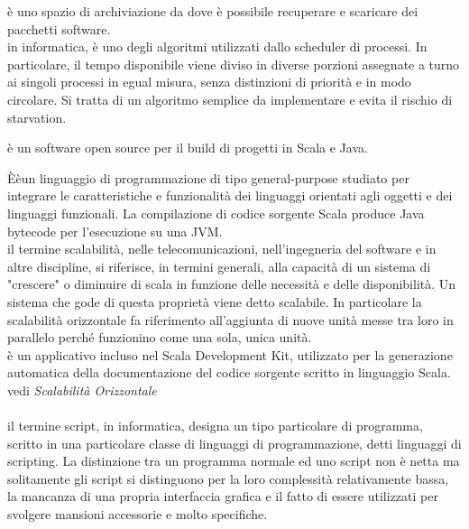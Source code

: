 \documentclass{scalatekids-article}
\begin{document}
   è uno spazio di archiviazione da dove è possibile recuperare e scaricare dei pacchetti software.
  \\
  
   in informatica, è uno degli algoritmi utilizzati dallo scheduler di processi.
  In particolare, il tempo disponibile viene diviso in diverse porzioni assegnate a turno ai singoli processi in egual misura, senza distinzioni di priorità e in modo circolare.
  Si tratta di un algoritmo semplice da implementare e evita il rischio di starvation.
  \\


   è un software open source per il build di progetti in Scala e Java.

   Èèun linguaggio di programmazione di tipo general-purpose studiato per integrare le caratteristiche e funzionalità dei linguaggi orientati agli oggetti e dei linguaggi funzionali. La compilazione di codice sorgente Scala produce Java bytecode per l'esecuzione su una JVM.
  \\

   il termine scalabilità, nelle telecomunicazioni, nell'ingegneria del software e in altre discipline, si riferisce, in termini generali, alla capacità di un sistema di "crescere" o diminuire di scala in funzione delle necessità e delle disponibilità. Un sistema che gode di questa proprietà viene detto scalabile.
  In particolare la scalabilità orizzontale fa riferimento all’aggiunta di nuove unità messe tra loro in parallelo perché funzionino come una sola, unica unità.
  \\

   è un applicativo incluso nel Scala Development Kit, utilizzato per la generazione automatica della documentazione del codice sorgente scritto in linguaggio Scala.
  \\

   vedi \textit{Scalabilità Orizzontale}
  \\
  
  \\

   il termine script, in informatica, designa un tipo particolare di programma, scritto in una particolare classe di linguaggi di programmazione, detti linguaggi di scripting.
  La distinzione tra un programma normale ed uno script non è netta ma solitamente gli script si distinguono per la loro complessità relativamente bassa, la mancanza di una propria interfaccia grafica e il fatto di essere utilizzati per svolgere mansioni accessorie e molto specifiche.
  \\
\end{document}

